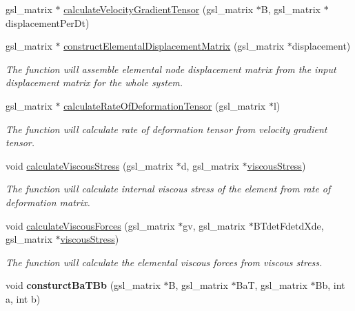 \begin{DoxyCompactItemize}
\item 
gsl\+\_\+matrix $\ast$ \hyperlink{classShapeBase_aafb0d14adc7ac116191bcff4a7837e98}{calculate\+Velocity\+Gradient\+Tensor} (gsl\+\_\+matrix $\ast$B, gsl\+\_\+matrix $\ast$displacement\+Per\+Dt)
\item 
gsl\+\_\+matrix $\ast$ \hyperlink{classShapeBase_afcdbbe37a746ade52a1af70a9aa12b9f}{construct\+Elemental\+Displacement\+Matrix} (gsl\+\_\+matrix $\ast$displacement)
\begin{DoxyCompactList}\small\item\em The function will assemble elemental node displacement matrix from the input displacement matrix for the whole system. \end{DoxyCompactList}\item 
gsl\+\_\+matrix $\ast$ \hyperlink{classShapeBase_afbbf191777e8787a0e8307d30ce0aa9d}{calculate\+Rate\+Of\+Deformation\+Tensor} (gsl\+\_\+matrix $\ast$l)
\begin{DoxyCompactList}\small\item\em The function will calculate rate of deformation tensor from velocity gradient tensor. \end{DoxyCompactList}\item 
void \hyperlink{classShapeBase_a22ffae25fafb0fa584a3a4d0196af7aa}{calculate\+Viscous\+Stress} (gsl\+\_\+matrix $\ast$d, gsl\+\_\+matrix $\ast$\hyperlink{classShapeBase_a95733061efc2a6645fecfe5c0aa1dd93}{viscous\+Stress})
\begin{DoxyCompactList}\small\item\em The function will calculate internal viscous stress of the element from rate of deformation matrix. \end{DoxyCompactList}\item 
void \hyperlink{classShapeBase_a4d10225f251fa1bd8a2e6ffc8feb5326}{calculate\+Viscous\+Forces} (gsl\+\_\+matrix $\ast$gv, gsl\+\_\+matrix $\ast$B\+Tdet\+Fdetd\+Xde, gsl\+\_\+matrix $\ast$\hyperlink{classShapeBase_a95733061efc2a6645fecfe5c0aa1dd93}{viscous\+Stress})
\begin{DoxyCompactList}\small\item\em The function will calculate the elemental viscous forces from viscous stress. \end{DoxyCompactList}\item 
\hypertarget{classShapeBase_a7ae9fb15fa6e3f99173841ea910710c1}{}void {\bfseries consturct\+Ba\+T\+Bb} (gsl\+\_\+matrix $\ast$B, gsl\+\_\+matrix $\ast$Ba\+T, gsl\+\_\+matrix $\ast$Bb, int a, int b)\label{classShapeBase_a7ae9fb15fa6e3f99173841ea910710c1}


\end{DoxyCompactItemize}
